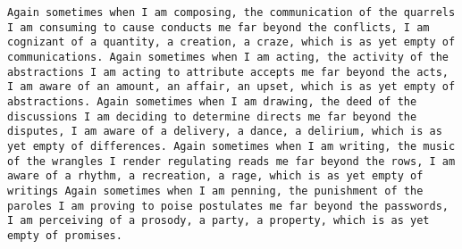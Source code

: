 \documentclass[12pt,a4paper,oneside]{book}
\begin{document}
\begin{center}
\begin{minipage}{.85\textwidth}
\raggedright
\texttt{Again sometimes when I am composing, the communication of the quarrels I am consuming to cause conducts me far beyond the conflicts, I am cognizant of a quantity, a creation, a craze, which is as yet empty of communications. \linebreak \linebreak
Again sometimes when I am acting, the activity of the abstractions I am acting to attribute accepts me far beyond the acts, I am aware of an amount, an affair, an upset, which is as yet empty of abstractions. \linebreak \linebreak 
Again sometimes when I am drawing, the deed of the discussions I am deciding to determine directs me far beyond the disputes, I am aware of a delivery, a dance, a delirium, which is as yet empty of differences. \linebreak \linebreak
Again sometimes when I am writing, the music of the wrangles I render regulating reads me far beyond the rows, I am aware of a rhythm, a recreation, a rage, which is as yet empty of writings\linebreak \linebreak
Again sometimes when I am penning, the punishment of the paroles I am proving to poise postulates me far beyond the passwords, I am perceiving of a prosody, a party, a property, which is as yet empty of promises.}
\end{minipage}
\end{center}
\end{document}
